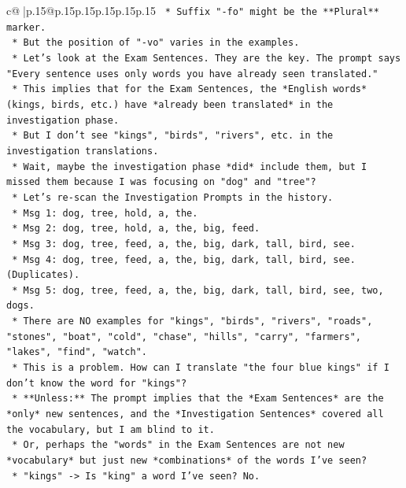 \documentclass{article}
\begin{document}
{\begin{supertabular}{c@{$\;$}|p{.15\linewidth}@{}p{.15\linewidth}p{.15\linewidth}p{.15\linewidth}p{.15\linewidth}p{.15\linewidth}}
{{{\texttt{        *   Suffix "{-}fo" might be the **Plural** marker.} \\
\texttt{        *   But the position of "{-}vo" varies in the examples.} \\
\texttt{        *   Let's look at the Exam Sentences. They are the key. The prompt says "Every sentence uses only words you have already seen translated."} \\
\texttt{        *   This implies that for the Exam Sentences, the *English words* (kings, birds, etc.) have *already been translated* in the investigation phase.} \\
\texttt{        *   But I don't see "kings", "birds", "rivers", etc. in the investigation translations.} \\
\texttt{        *   Wait, maybe the investigation phase *did* include them, but I missed them because I was focusing on "dog" and "tree"?} \\
\texttt{        *   Let's re{-}scan the Investigation Prompts in the history.} \\
\texttt{            *   Msg 1: dog, tree, hold, a, the.} \\
\texttt{            *   Msg 2: dog, tree, hold, a, the, big, feed.} \\
\texttt{            *   Msg 3: dog, tree, feed, a, the, big, dark, tall, bird, see.} \\
\texttt{            *   Msg 4: dog, tree, feed, a, the, big, dark, tall, bird, see. (Duplicates).} \\
\texttt{            *   Msg 5: dog, tree, feed, a, the, big, dark, tall, bird, see, two, dogs.} \\
\texttt{        *   There are NO examples for "kings", "birds", "rivers", "roads", "stones", "boat", "cold", "chase", "hills", "carry", "farmers", "lakes", "find", "watch".} \\
\texttt{        *   This is a problem. How can I translate "the four blue kings" if I don't know the word for "kings"?} \\
\texttt{        *   **Unless:** The prompt implies that the *Exam Sentences* are the *only* new sentences, and the *Investigation Sentences* covered all the vocabulary, but I am blind to it.} \\
\texttt{        *   Or, perhaps the "words" in the Exam Sentences are not new *vocabulary* but just new *combinations* of the words I've seen?} \\
\texttt{            *   "kings" {-}> Is "king" a word I've seen? No.} \\
}}}
\end{supertabular}}
\end{document}
